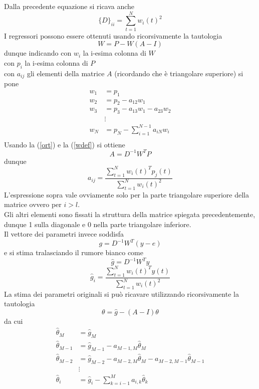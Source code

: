 Dalla precedente equazione si ricava anche
\begin{equation}
\{D\}_{ii}=\sum_{t=1}^N w_i(t)^2
\end{equation}
I regressori possono essere ottenuti usando ricorsivamente la tautologia
\begin{equation}
W=P-W(A-I)
\end{equation}
dunque indicando con $w_i$ la i-esima colonna di $W$\\
con $p_i$ la i-esima colonna di $P$\\
con $a_{ij}$ gli elementi della matrice $A$ (ricordando che è triangolare superiore)
si pone
\begin{align*}
w_1&=p_1\\
w_2&=p_2-a_{12}w_1\\
w_3&=p_3-a_{13}w_1-a_{23}w_2\\
&\vdots\\
w_N&=p_N-\sum_{i=1}^{N-1}a_{iN}w_i\\
\end{align*}
Usando la (\ref{ort}) e la (\ref{wdef}) si ottiene 
\begin{equation}
A=D^{-1}W^TP
\end{equation}
dunque
\begin{equation}
a_{ij}=\frac{\sum_{t=1}^N{w_i(t)^Tp_j(t)}}{\sum_{t=1}^Nw_i(t)^2}
\end{equation}
L'espressione sopra vale ovviamente solo per la parte triangolare superiore della matrice ovvero per $i>l$.\\
Gli altri elementi sono fissati la struttura della matrice spiegata precedentemente, dunque 1 sulla diagonale e 0 nella parte triangolare inferiore.\\
Il vettore dei parametri invece soddisfa
\begin{equation}
g=D^{-1}W^T(y-e)
\end{equation}
e  si stima tralasciando il rumore bianco come
\begin{equation}
\hat{g}=D^{-1}W^Ty
\end{equation}
\begin{equation}
\hat{g}_i=\frac{\sum_{t=1}^N{w_i(t)^Ty(t)}}{\sum_{t=1}^Nw_i(t)^2}
\end{equation}
La stima dei parametri originali  si può ricavare utilizzando ricorsivamente la tautologia
\begin{equation}
\theta=\hat{g}-(A-I)\theta
\end{equation}
da cui
\begin{align*}
\label{origparam}
\hat{\theta}_M &=\hat{g}_M\\
\hat{\theta}_{M-1} &=\hat{g}_{M-1}-a_{M-1,M}\hat{\theta}_M\\
\hat{\theta}_{M-2} &=\hat{g}_{M-2}-a_{M-2,M}\hat{\theta}_M-a_{M-2,M-1}\hat{\theta}_{M-1}\\
&\vdots \\
\hat{\theta}_{i} &=\hat{g}_{i}-\sum_{k=i-1}^Ma_{i,k}\hat{\theta}_k\\
\end{align*}
